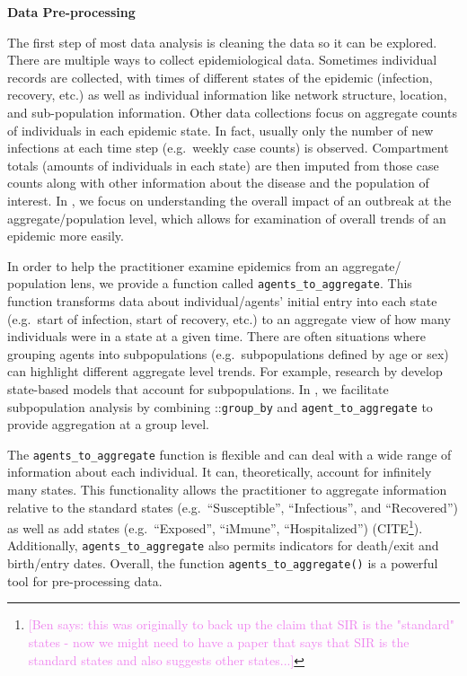 \documentclass[
  shortnames]{jss}
\begin{document}
\textbf{Data Pre-processing}

The first step of most data analysis is cleaning the data so it can be
explored. There are multiple ways to collect epidemiological data.
Sometimes individual records are collected, with times of different
states of the epidemic (infection, recovery, etc.) as well as individual
information like network structure, location, and sub-population
information. Other data collections focus on aggregate counts of
individuals in each epidemic state. In fact, usually only the number of
new infections at each time step (e.g.~weekly case counts) is observed.
Compartment totals (amounts of individuals in each state) are then
imputed from those case counts along with other information about the
disease and the population of interest. In , we focus on
understanding the overall impact of an outbreak at the
aggregate/population level, which allows for examination of overall
trends of an epidemic more easily.

In order to help the practitioner examine epidemics from an aggregate/
population lens, we provide a function called
\texttt{agents\_to\_aggregate}. This function transforms data about
individual/agents' initial entry into each state (e.g.~start of
infection, start of recovery, etc.) to an aggregate view of how many
individuals were in a state at a given time. There are often situations
where grouping agents into subpopulations (e.g.~subpopulations defined
by age or sex) can highlight different aggregate level trends. For
example, research by \citet{rvachev1985,anderson1992,worby2015} develop
state-based models that account for subpopulations. In ,
we facilitate subpopulation analysis by combining
::\texttt{group\_by} and \texttt{agent\_to\_aggregate} to
provide aggregation at a group level.

The \texttt{agents\_to\_aggregate} function is flexible and can deal
with a wide range of information about each individual. It can,
theoretically, account for infinitely many states. This functionality
allows the practitioner to aggregate information relative to the
standard states (e.g.~``Susceptible'', ``Infectious'', and
``Recovered'') as well as add states (e.g.~``Exposed'', ``iMmune'',
``Hospitalized'')
(CITE\footnote{\textcolor{violet}{[Ben says: this was originally to back up the claim that SIR is the "standard" states - now we might need to have a paper that says that SIR is the standard states and also suggests other states...]}}).
Additionally, \texttt{agents\_to\_aggregate} also permits indicators for
death/exit and birth/entry dates. Overall, the function
\texttt{agents\_to\_aggregate()} is a powerful tool for pre-processing
data.
\end{document}
